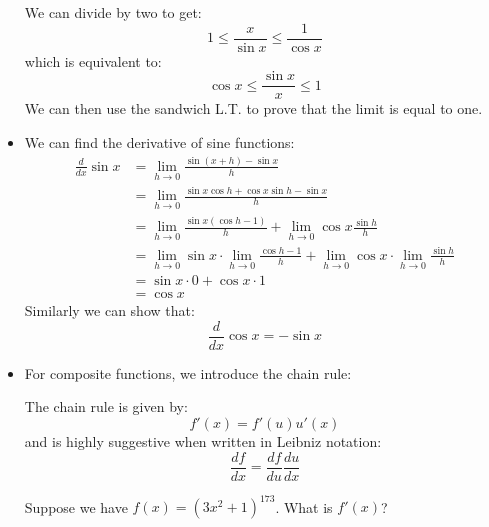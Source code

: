 \begin{itemize}
\begin{example}
        We can divide by two to get:
        \begin{equation}
            1 \le \frac{x}{\sin x} \le \frac{1}{\cos x}
            \label{eq:}
        \end{equation}
        which is equivalent to:
        \begin{equation}
            \cos x \le \frac{\sin x}{x} \le 1
            \label{eq:}
        \end{equation}
        We can then use the sandwich L.T. to prove that the limit is equal to one.
    \end{example}
    \item We can find the derivative of sine functions:
    \begin{align}
        \frac{d}{dx}\sin x &= \lim_{h\to 0} \frac{\sin(x+h)-\sin x}{h} \\ 
        &= \lim_{h\to 0} \frac{\sin x\cos h+\cos x\sin h - \sin x}{h} \\ 
        &= \lim_{h\to 0} \frac{\sin x(\cos h-1)}{h}+\lim_{h\to0} \cos x\frac{\sin h}{h} \\ 
        &= \lim_{h\to 0}\sin x \cdot \lim_{h\to 0} \frac{\cos h-1}{h} + \lim_{h\to 0} \cos x \cdot \lim_{h\to 0} \frac{\sin h}{h} \\ 
        &= \sin x \cdot 0 + \cos x \cdot 1 \\ 
        &= \cos x
        \label{eq:}
    \end{align}
    Similarly we can show that:
    \begin{equation}
        \frac{d}{dx}\cos x = -\sin x
        \label{eq:}
    \end{equation}
    \item For composite functions, we introduce the chain rule:
    \begin{theorem}
        The chain rule is given by:
        \begin{equation}
            f'(x)=f'(u)u'(x)
            \label{eq:}
        \end{equation}
        and is highly suggestive when written in Leibniz notation:
        \begin{equation}
            \frac{df}{dx} = \frac{df}{du}\frac{du}{dx}
            \label{eq:}
        \end{equation}
        
    \end{theorem}
    
    \begin{example}
        Suppose we have $f(x)=(3x^2+1)^{173}$. What is $f'(x)$?
        \vspace{2mm}


\end{example}
\end{itemize}
